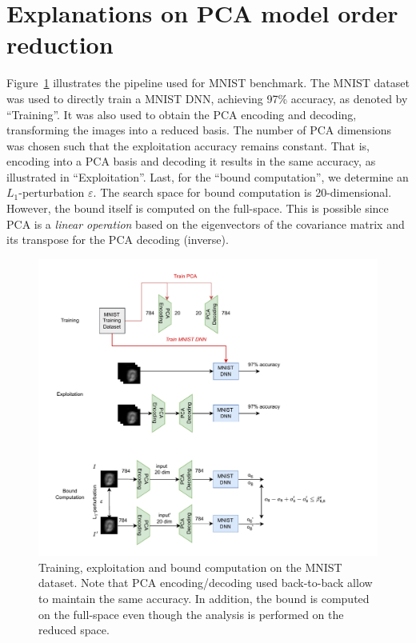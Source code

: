 \section{Explanations on PCA model order reduction}


Figure~\ref{fig.MNIST} illustrates the pipeline used for MNIST benchmark. The MNIST dataset was used to directly train a MNIST DNN, achieving 97\% accuracy, as denoted by ``Training''. 
%
It was also used to obtain the PCA encoding and decoding, transforming the images into a reduced basis. The number of PCA dimensions was chosen such that the exploitation accuracy remains constant. That is, encoding into a PCA basis and decoding it results in the same accuracy, as illustrated in ``Exploitation''. 
%
Last, for the ``bound computation'', we determine an $L_1$-perturbation $\varepsilon$. The search space for bound computation is 20-dimensional. However, the bound itself is computed on the full-space. This is possible since PCA is a \emph{linear operation} based on the eigenvectors of the covariance matrix and its transpose for the PCA decoding (inverse).

\begin{figure}[]
	\centering
	\includegraphics[scale=0.9]{MNIST.pdf} \hspace{1.5cm}
	\caption{Training, exploitation and bound computation on the MNIST dataset. Note that PCA encoding/decoding used back-to-back allow to maintain the same accuracy. In addition, the bound is computed on the full-space even though the analysis is performed on the reduced space.}
	\label{fig.MNIST}
\end{figure}	

